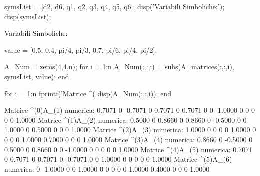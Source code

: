 \documentclass[11pt, a4paper]{article}
\begin{document}
\begin{matlabcode}
symsList = [d2, d6, q1, q2, q3, q4, q5, q6];
disp('Variabili Simboliche:');
disp(symsList);
\end{matlabcode}
\begin{matlaboutput}
Variabili Simboliche:
\end{matlaboutput}
\newpage
\begin{matlabcode}
value = [0.5, 0.4, pi/4, pi/3, 0.7, pi/6, pi/4, pi/2];

A_Num = zeros(4,4,n);
for i = 1:n
    A_Num(:,:,i) = subs(A_matrices(:,:,i), symsList, value);
end

for i = 1:n
    fprintf('Matrice ^(%
    disp(A_Num(:,:,i));
end
\end{matlabcode}
\begin{matlaboutput}
Matrice ^(0)A_(1) numerica:
    0.7071         0   -0.7071         0
    0.7071         0    0.7071         0
         0   -1.0000         0         0
         0         0         0    1.0000
Matrice ^(1)A_(2) numerica:
    0.5000         0    0.8660         0
    0.8660         0   -0.5000         0
         0    1.0000         0    0.5000
         0         0         0    1.0000
Matrice ^(2)A_(3) numerica:
    1.0000         0         0         0
         0    1.0000         0         0
         0         0    1.0000    0.7000
         0         0         0    1.0000
Matrice ^(3)A_(4) numerica:
    0.8660         0   -0.5000         0
    0.5000         0    0.8660         0
         0   -1.0000         0         0
         0         0         0    1.0000
Matrice ^(4)A_(5) numerica:
    0.7071         0    0.7071         0
    0.7071         0   -0.7071         0
         0    1.0000         0         0
         0         0         0    1.0000
Matrice ^(5)A_(6) numerica:
         0   -1.0000         0         0
    1.0000         0         0         0
         0         0    1.0000    0.4000
         0         0         0    1.0000
\end{matlaboutput}
\end{document}
